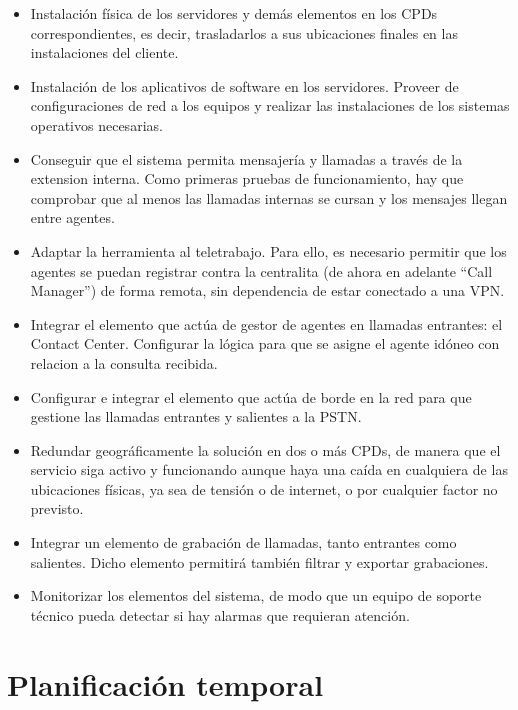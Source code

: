 \documentclass[a4paper, 12pt]{book}
\begin{document}
\begin{itemize}
  \item Instalación física de los servidores y demás elementos en los CPDs correspondientes, es decir, trasladarlos a sus ubicaciones finales en las instalaciones del cliente.
  
  \item Instalación de los aplicativos de software en los servidores. Proveer de configuraciones de red a los equipos y realizar las instalaciones de los sistemas operativos necesarias.

  \item Conseguir que el sistema permita mensajería y llamadas a través de la extension interna. Como primeras pruebas de funcionamiento, hay que comprobar que al menos las llamadas internas se cursan y los mensajes llegan entre agentes.
  
  \item Adaptar la herramienta al teletrabajo. Para ello, es necesario permitir que los agentes se puedan registrar contra la centralita (de ahora en adelante ``Call Manager'') de forma remota, sin dependencia de estar conectado a una VPN.   

  \item Integrar el elemento que actúa de gestor de agentes en llamadas entrantes: el Contact Center. Configurar la lógica para que se asigne el agente idóneo con relacion a la consulta recibida.

  \item Configurar e integrar el elemento que actúa de borde en la red para que gestione las llamadas entrantes y salientes a la PSTN.
  
  \item Redundar geográficamente la solución en dos o más CPDs, de manera que el servicio siga activo y funcionando aunque haya una caída en cualquiera de las ubicaciones físicas, ya sea de tensión o de internet, o por cualquier factor no previsto.

  \item Integrar un elemento de grabación de llamadas, tanto entrantes como salientes. Dicho elemento permitirá también filtrar y exportar grabaciones.
  
  \item Monitorizar los elementos del sistema, de modo que un equipo de soporte técnico pueda detectar si hay alarmas que requieran atención.
\end{itemize}

\section{Planificación temporal}
\label{sec:planificacion-temporal}
\end{document}
